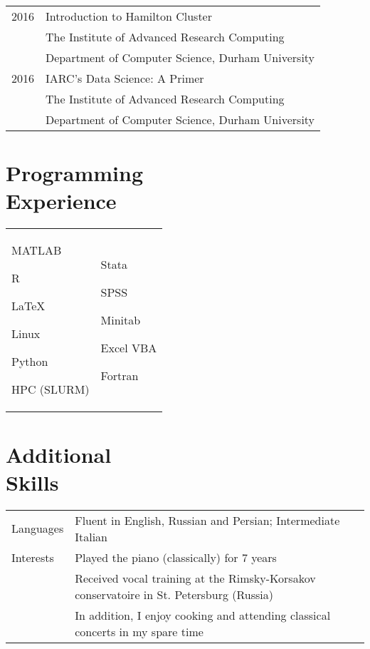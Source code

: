 \documentclass[margin,line,pifont,palatino,courier]{res}
\newenvironment{list1}{
  \begin{list}{\ding{113}}{%
      \setlength{\itemsep}{0in}
      \setlength{\parsep}{0in} \setlength{\parskip}{0in}
      \setlength{\topsep}{0in} \setlength{\partopsep}{0in}
      \setlength{\leftmargin}{0.17in}}}{\end{list}}
\begin{document}
\begin{resume}
\begin{tabular}{@{}p{0.8in}p{4in}}
\rule{0pt}{4ex}2016 & Introduction to Hamilton Cluster\\
&The Institute of Advanced Research Computing\\
&Department of Computer Science, Durham University\\

\rule{0pt}{4ex}2016 & IARC's Data Science: A Primer\\
&The Institute of Advanced Research Computing\\
&Department of Computer Science, Durham University\\
\end{tabular}

\hrulefill

\section{\sc \bf Programming \\ Experience}
\begin{tabular}{@{}p{2.3in}p{3in}}
\begin{list1}
\item MATLAB
\item R
\item \LaTeX
\item Linux
\item Python
\item HPC (SLURM)
\end{list1}
&
\begin{list1}
\item Stata
\item SPSS
\item Minitab
\item Excel VBA
\item Fortran
\end{list1}

\end{tabular}

\hrulefill

\section{\sc \bf Additional \\ Skills}

\begin{tabular}{@{}p{0.8in}p{4in}}

Languages& Fluent in English, Russian and Persian; Intermediate Italian\\
\rule{0pt}{4ex}Interests& Played the piano (classically) for 7 years\\
&Received vocal training at the Rimsky-Korsakov conservatoire in St. Petersburg (Russia)\\
&In addition, I enjoy cooking and attending classical concerts in my spare time
\end{tabular}


\end{resume}
\end{document}
